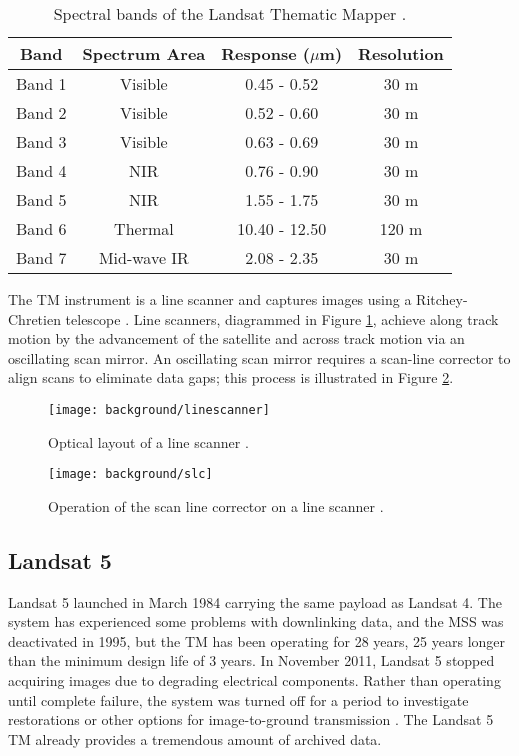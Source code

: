 \documentclass{book}
\begin{document}
\begin{table}[H]
\begin{center}
\begin{tabular}{|c | c | c | c |}
\hline
Band & Spectrum Area & Response ($\mu$m) & Resolution \\ \hline
Band 1 & Visible & 0.45 - 0.52 & 30 m \\ \hline
Band 2 & Visible & 0.52 - 0.60 & 30 m \\ \hline
Band 3 & Visible & 0.63 - 0.69 & 30 m \\ \hline
Band 4 & NIR & 0.76 - 0.90 & 30 m \\ \hline
Band 5 & NIR & 1.55 - 1.75 & 30 m \\ \hline
Band 6 & Thermal & 10.40 - 12.50 & 120 m \\ \hline
Band 7 & Mid-wave IR & 2.08 - 2.35 & 30 m \\ \hline
\end{tabular}
\caption{Spectral bands of the Landsat Thematic Mapper \cite{landsat_usgs}.}
\label{tab:TMbands}
\end{center}
\end{table}

The TM instrument is a line scanner and captures images using a Ritchey-Chretien telescope \cite{engel_1983}.  Line scanners, diagrammed in Figure \ref{fig:linescanner}, achieve along track motion by the advancement of the satellite and across track motion via an oscillating scan mirror.  An oscillating scan mirror requires a scan-line corrector to align scans to eliminate data gaps; this process is illustrated in Figure \ref{fig:slc}.

\begin{figure}%
\centering
\texttt{[image: background/linescanner]}
\caption{Optical layout of a line scanner \cite{schott}.}
\label{fig:linescanner}
\end{figure}

\begin{figure}[H]
\centering
\texttt{[image: background/slc]}
\caption{Operation of the scan line corrector on a line scanner \cite{schott}.}
\label{fig:slc}
\end{figure}


\subsection{Landsat 5}
\label{sec:landsat5}

Landsat 5 launched in March 1984 carrying the same payload as Landsat 4.  The system has experienced some problems with downlinking data, and the MSS was deactivated in 1995, but the TM has been operating for 28 years, 25 years longer than the minimum design life of 3 years.  In November 2011, Landsat 5 stopped acquiring images due to degrading electrical components.  Rather than operating until complete failure, the system was turned off for a period to investigate restorations or other options for image-to-ground transmission \cite{landsat_nasa}.  The Landsat 5 TM already provides a tremendous amount of archived data.
\end{document}
